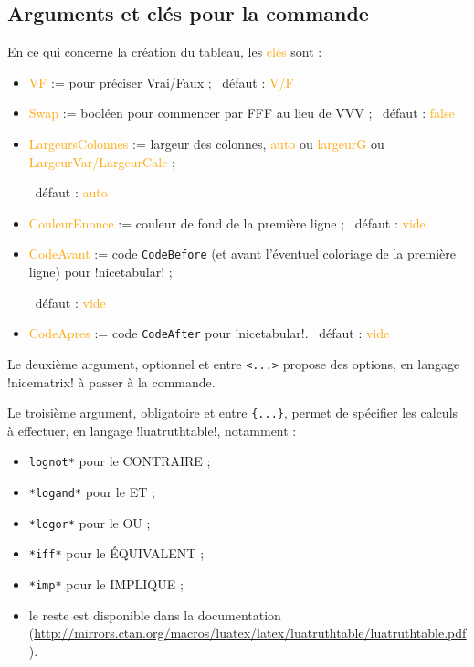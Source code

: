 \documentclass[french,a4paper,11pt]{article}
\newcommand\Cle[1]{{\small\sffamily\textlangle \textcolor{orange}{#1}\textrangle}}
\begin{document}
{{\begin{DemoCode}[]
\end{DemoCode}

\subsection{Arguments et clés pour la commande}

\begin{DemoCode}
\end{DemoCode}

\begin{tipblock}
En ce qui concerne la création du tableau, les \Cle{clés} sont :

\begin{itemize}
	\item \Cle{VF} := pour préciser Vrai/Faux ; \hfill~défaut : \Cle{V/F}
	\item \Cle{Swap} := booléen pour commencer par FFF au lieu de VVV ; \hfill~défaut : \Cle{false}
	\item \Cle{LargeursColonnes} := largeur des colonnes, \Cle{auto} ou \Cle{largeurG} ou \Cle{LargeurVar/LargeurCalc} ;
	
	\hfill~défaut : \Cle{auto}
	\item \Cle{CouleurEnonce} := couleur de fond de la première ligne ; \hfill~défaut : \Cle{vide}
	\item \Cle{CodeAvant} := code \texttt{CodeBefore} (et avant l'éventuel coloriage de la première ligne) pour \motcletex!nicetabular! ;
	
	\hfill~défaut : \Cle{vide}
	\item \Cle{CodeApres} := code \texttt{CodeAfter} pour \motcletex!nicetabular!. \hfill~défaut : \Cle{vide}
\end{itemize}

Le deuxième argument, optionnel et entre \texttt{<...>} propose des options, en langage \packagetex!nicematrix! à passer à la commande.
\end{tipblock}

\pagebreak

\begin{tipblock}
Le troisième argument, obligatoire et entre \texttt{\{...\}}, permet de spécifier les calculs à effectuer, en langage \motcletex!luatruthtable!, notamment :

\begin{itemize}
	\item \texttt{lognot*} pour le \textsf{CONTRAIRE} ;
	\item \texttt{*logand*} pour le \textsf{ET} ;
	\item \texttt{*logor*} pour le \textsf{OU} ;
	\item \texttt{*iff*} pour le \textsf{ÉQUIVALENT} ;
	\item \texttt{*imp*} pour le \textsf{IMPLIQUE} ;
	\item le reste est disponible dans la documentation (\url{http://mirrors.ctan.org/macros/luatex/latex/luatruthtable/luatruthtable.pdf}).
\end{itemize}


\end{tipblock}}}
\end{document}
